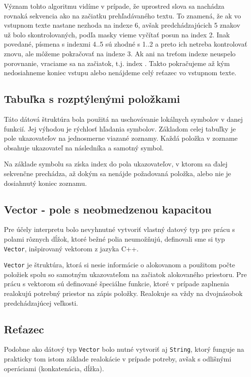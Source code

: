\documentclass[12pt,a4paper,titlepage,final]{article}
\begin{document}
Význam tohto algoritmu vidíme v prípade, že uprostred slova sa nachádza
 rovnaká sekvencia ako na začiatku prehľadávaného textu.
To znamená, že ak vo vstupnom texte nastane nezhoda na indexe 6, avšak
 predchádzajúcich 5 znakov už bolo skontrolovaných, podľa masky vieme vyčítať
 posun na index 2. Inak povedané, písmena s indexmi 4..5 sú zhodné s 1..2
 a preto ich netreba kontrolovať znovu, ale môžeme pokračovať na indexe 3.
Ak ani na treťom indexe neuspelo porovnanie, vraciame sa na začiatok, t.j.
index . Takto pokračujeme až kým nedosiahneme koniec vstupu alebo
nenájdeme celý reťazec vo vstupnom texte.

\subsection{Tabuľka s rozptýlenými položkami}
Táto dátová štruktúra bola použitá na uschovávanie lokálnych symbolov v danej
 funkcií. Jej výhodou je rýchlosť hľadania symbolov. 
Základom celej tabuľky je pole ukazovateľov na jednosmerne viazané zoznamy.
Každá položka v zozname obsahuje ukazovateľ na následníka a samotný symbol.

Na základe symbolu sa získa index do pola ukazovateľov, v ktorom sa ďalej
 sekvenčne prechádza, až dokým sa nenájde požadovaná položka, alebo nie je
 dosiahnutý koniec zoznamu.
 
\subsection{Vector - pole s neobmedzenou kapacitou}
Pre účely interpretu bolo nevyhnutné vytvoriť vlastný datový typ pre prácu
s polami rôznych dĺžok, ktoré bežné polia neumožňujú, definovali sme si
typ \texttt{Vector}, inšpirovaný vektorom z jazyka C++. 

\texttt{Vector} je štruktúra, ktorá si nesie informácie o alokovanom a použitom 
počte položiek spolu so samotným ukazovateľom na začiatok alokovaného priestoru. 
Pre prácu s vektorom sú definované špeciálne funkcie, ktoré v prípade zaplnenia
realokujú potrebný priestor na zápis položky. Realokuje sa vždy na dvojnásobok
predchádzajúcej veľkosti.


\subsection{Reťazec}
Podobne ako dátový typ \texttt{Vector} bolo nutné vytvoriť aj \texttt{String},
ktorý funguje na prakticky tom istom základe realokácie v prípade potreby,
avšak s odlišnými operáciami (konkatenácia, dĺžka).
\end{document}
